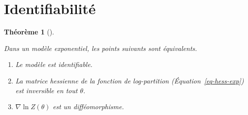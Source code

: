 \documentclass[
  10,
  letterpaper,
  DIV=11,
  numbers=noendperiod]{scrreport}
\providecommand{\tightlist}{%
  \setlength{\itemsep}{0pt}\setlength{\parskip}{0pt}}\usepackage{longtable,booktabs,array}
\theoremstyle{plain}
\newtheorem{theorem}{Théorème}[chapter]
\theoremstyle{definition}
\theoremstyle{plain}
\theoremstyle{definition}
\theoremstyle{definition}
\theoremstyle{plain}
\theoremstyle{remark}
\begin{document}
\hypertarget{identifiabilituxe9}{%
\section{Identifiabilité}\label{identifiabilituxe9}}

\begin{theorem}[]\protect\hypertarget{thm-iden-expo}{}\label{thm-iden-expo}

Dans un modèle exponentiel, les points suivants sont équivalents.

\begin{enumerate}
\def\labelenumi{\roman{enumi})}
\tightlist
\item
  Le modèle est identifiable.
\item
  La matrice hessienne de la fonction de log-partition
  (Équation~\ref{eq-hess-exp}) est inversible en tout \(\theta\).
\item
  \(\nabla \ln Z(\theta)\) est un difféomorphisme.
\end{enumerate}

\end{theorem}
\end{document}

